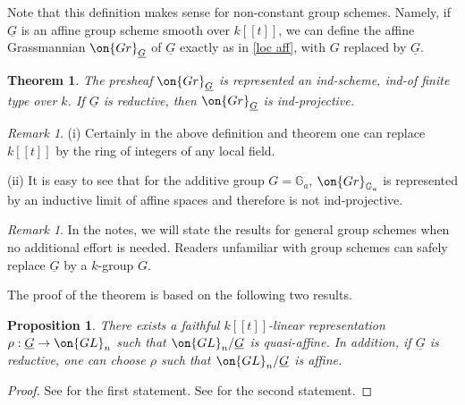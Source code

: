 \documentclass[]{pcmi}
\theoremstyle{plain}
\newtheorem{thm}[equation]{Theorem}
\newtheorem{prop}[equation]{Proposition}
\theoremstyle{remark}
\newtheorem{rmk}[equation]{Remark}
\theoremstyle{definition}
\newcommand{\bG}{{\mathbb G}}
\newcommand{\Gr}{{\on{Gr}}}
\newcommand{\GL}{{\on{GL}}}
\begin{document}
Note that this definition makes sense for non-constant group schemes. Namely, if $\underline G$ is an affine group scheme smooth over $k[[t]]$, we can define the affine Grassmannian $\Gr_{\underline G}$ of $\underline G$ exactly as in \eqref{loc aff}, with $G$ replaced by $\underline G$. 

\begin{thm}\label{I:rep aff}
The presheaf $\Gr_{\underline G}$ is represented an ind-scheme, ind-of finite type over $k$. If $\underline G$ is reductive, then $\Gr_{\underline G}$ is ind-projective.
\end{thm}
\begin{rmk}
(i) Certainly in the above definition and theorem one can replace $k[[t]]$ by the ring of integers of any local field. 

(ii) It is easy to see that for the additive group $G=\bG_a$, $\Gr_{\bG_a}$ is represented by an inductive limit of affine spaces and therefore is not ind-projective. 
\end{rmk}

\begin{rmk}In the notes, we will state the results for general group schemes when no additional effort is needed. Readers unfamiliar with group schemes can safely replace $\underline G$ by a $k$-group $G$. 
\end{rmk}

The proof of the theorem is based on the following two results.
\begin{prop}\label{lin rep}
There exists a faithful $k[[t]]$-linear representation $\rho: \underline G\to \GL_n$ such that $\GL_n/\underline G$ is quasi-affine. In addition, if $\underline G$ is reductive, one can choose $\rho$ such that $\GL_n/\underline G$ is affine. 
\end{prop}
\begin{proof}See \cite[Proposition 1.3]{PR} for the first statement. See \cite[Corollary 9.7.7]{Ap} for the second statement.
\end{proof}
\end{document}
